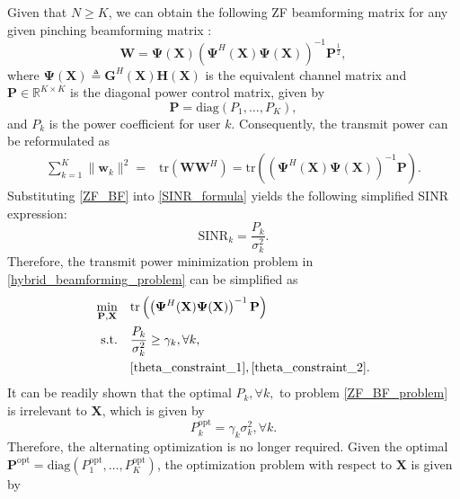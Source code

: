 Given that $N \ge K$, we can obtain the following ZF beamforming matrix for any given pinching beamforming matrix \cite{bjornson2014optimal}:
\begin{equation} \label{ZF_BF}
    \mathbf{W} = \mathbf{\Psi}(\mathbf{X}) \left( \mathbf{\Psi}^H(\mathbf{X}) \mathbf{\Psi}(\mathbf{X}) \right)^{-1} \mathbf{P}^{\frac{1}{2}},
\end{equation}  
where $\mathbf{\Psi}(\mathbf{X}) \triangleq \mathbf{G}^H(\mathbf{X}) \mathbf{H}(\mathbf{X})$ is the equivalent channel matrix and $\mathbf{P} \in \mathbb{R}^{K \times K}$ is the diagonal power control matrix, given by 
\begin{equation}
    \mathbf{P} = \mathrm{diag}\left( P_1,\dots,P_K \right),
\end{equation}  
and $P_k$ is the power coefficient for user $k$. Consequently, the transmit power can be reformulated as 
\begin{align}
    \sum_{k=1}^K \|\mathbf{w}_k\|^2 = &\mathrm{tr}\left( \mathbf{W} \mathbf{W}^H \right) = \mathrm{tr}\left( \left( \mathbf{\Psi}^H(\mathbf{X}) \mathbf{\Psi}(\mathbf{X}) \right)^{-1} \mathbf{P} \right).
\end{align}
Substituting \eqref{ZF_BF} into \eqref{SINR_formula} yields the following simplified SINR expression:
\begin{equation}
    \mathrm{SINR}_k = \frac{P_k}{\sigma_k^2}.
\end{equation} 
Therefore, the transmit power minimization problem in \eqref{hybrid_beamforming_problem} can be simplified as 
\begin{subequations} \label{ZF_BF_problem}
    \begin{align}
        \min_{\mathbf{P}, \mathbf{X}} \quad & \mathrm{tr}\left( \left( \mathbf{\Psi}^H(\mathbf{X}) \mathbf{\Psi}(\mathbf{X}) \right)^{-1} \mathbf{P} \right) \\
        \mathrm{s.t.} \quad & \frac{P_k}{\sigma_k^2} \ge \gamma_k, \forall k, \\
        & \eqref{theta_constraint_1}, \eqref{theta_constraint_2}.
    \end{align}
\end{subequations}
It can be readily shown that the optimal $P_k, \forall k,$ to problem \eqref{ZF_BF_problem} is irrelevant to $\mathbf{X}$, which is given by 
\begin{equation} \label{optimal_ZF_P}
    P^{\mathrm{opt}}_k = \gamma_k \sigma_k^2, \forall k.
\end{equation}  
Therefore, the alternating optimization is no longer required. Given the optimal $\mathbf{P}^{\mathrm{opt}} = \mathrm{diag}(P^{\mathrm{opt}}_1,\dots,P^{\mathrm{opt}}_K )$, the optimization problem with respect to $\mathbf{X}$ is given by 
